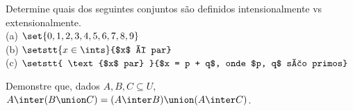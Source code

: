 \begin{exercise}
Determine quais dos seguintes conjuntos são definidos intensionalmente vs extensionalmente. \\
(a) $\set{ 0, 1, 2, 3, 4, 5, 6, 7, 8, 9 }$ \\
(b) $\setstt {x \in \ints} {$x$ é par}$ \\
(c) $\setstt { \text{$x$ par} } {$x = p + q$, onde $p, q$ são primos}$
\end{exercise}

\begin{exercise}
Demonstre que, dados $A, B, C \subseteq U$, $A \inter (B \union C) = (A \inter B) \union (A \inter C)$.
\end{exercise}
